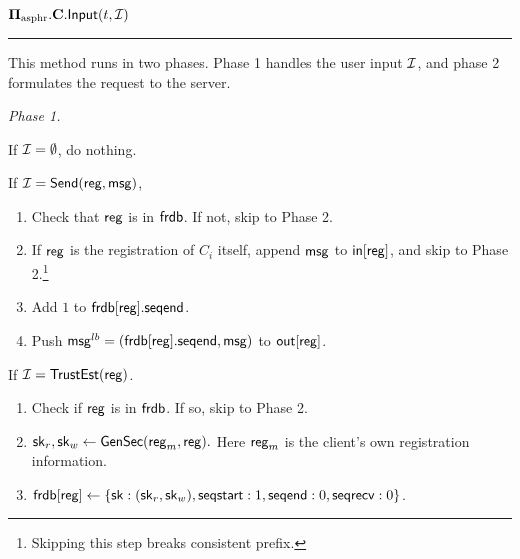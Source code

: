 \begin{definition}
\vspace{10pt}
$\mathbf{\Pi_{\text{asphr}}.C.\mathsf{Input}}(t, \mathcal{I})$
\vspace{5pt}
\hrule
\vspace{5pt}
This method runs in two phases. Phase 1 handles the user input $\mathcal{I}$, and phase 2 formulates the request to the server.

\textit{Phase 1.}

If $\mathcal{I} = \emptyset$, do nothing. 

If $\mathcal{I} = \mathsf{Send}(\mathsf{reg}, \mathsf{msg})$, 

\begin{enumerate}
    \item Check that $\mathsf{reg}$ is in $\mathsf{frdb}$. If not, skip to Phase 2.
    \item If $\mathsf{reg}$ is the registration of $C_i$ itself, append $\mathsf{msg}$ to $\mathsf{in}[\mathsf{reg}]$, and skip to Phase 2.\footnote{Skipping this step breaks consistent prefix.}
    \item Add $1$ to $\mathsf{frdb}[\mathsf{reg}].\mathsf{seqend}$. 
    \item Push $\mathsf{msg}^{lb} = (\mathsf{frdb}[\mathsf{reg}].\mathsf{seqend}, \mathsf{msg})$ to $\mathsf{out}[\mathsf{reg}]$.
\end{enumerate}

If $\mathcal{I} = \mathsf{TrustEst}(\mathsf{reg})$.
\begin{enumerate}
    \item Check if $\mathsf{reg}$ is in $\mathsf{frdb}$. If so, skip to Phase 2.
    \item ${\mathsf{sk}}_r, {\mathsf{sk}}_w \leftarrow \mathsf{GenSec}(\mathsf{reg}_m, \mathsf{reg}).$ Here $\mathsf{reg}_m$ is the client's own registration information.
    \item $\mathsf{frdb}[\mathsf{reg}] \leftarrow \{{\mathsf{sk}}: ({\mathsf{sk}}_r, {\mathsf{sk}}_w),  \mathsf{seqstart}: 1, \mathsf{seqend}: 0, \\ \mathsf{seqrecv}: 0\}$.
\end{enumerate}


\end{definition}
